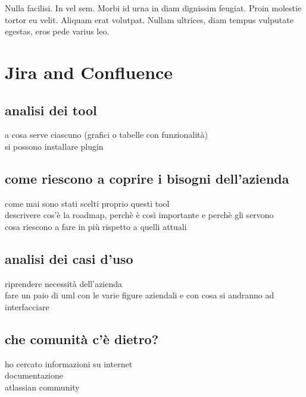 \begin{savequote}[75mm]
Nulla facilisi. In vel sem. Morbi id urna in diam dignissim feugiat. Proin molestie tortor eu velit. Aliquam erat volutpat. Nullam ultrices, diam tempus vulputate egestas, eros pede varius leo.
\end{savequote}

\chapter{Jira and Confluence}


\section{analisi dei tool}
a cosa serve ciascuno (grafici o tabelle con funzionalità)\\
si possono installare plugin

\section{come riescono a coprire i bisogni dell'azienda}
come mai sono stati scelti proprio questi tool\\
descrivere cos'è la roadmap, perchè è così importante e perchè gli servono\\
cosa riescono a fare in più rispetto a quelli attuali

\section{analisi dei casi d'uso}
riprendere necessità dell'azienda\\
fare un paio di uml con le varie figure aziendali e con cosa si andranno ad interfacciare

\section{che comunità c'è dietro?}
ho cercato informazioni su internet\\
documentazione\\
atlassian community
